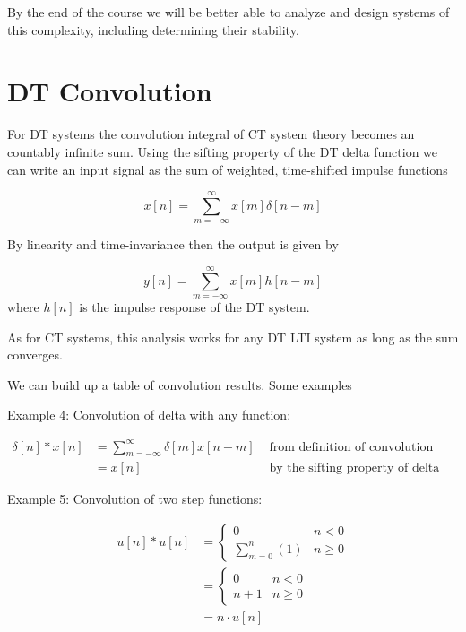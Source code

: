 \documentclass{article}
\begin{document}
By the end of the course we will be better able to analyze and design systems of this complexity, including determining their stability.

\section{DT Convolution}

For DT systems the convolution integral of CT system theory becomes an countably infinite sum. Using the sifting property of the DT delta function we can write an input signal as the sum of weighted, time-shifted impulse functions

\begin{equation}
  x[n] = \sum\limits_{m = -\infty}^{\infty} x[m]\delta[n-m]
\end{equation}

By linearity and time-invariance then the output is given by

\begin{equation}
y[n] = \sum\limits_{m = -\infty}^{\infty} x[m]h[n-m]
\end{equation}
where $h[n]$ is the impulse response of the DT system.

As for CT systems, this analysis works for any DT LTI system as long as the sum converges.

We can build up a table of convolution results. Some examples

Example 4: Convolution of delta with any function:

\begin{align}
  \delta[n] * x[n] &= \sum\limits_{m = -\infty}^{\infty} \delta[m]x[n-m] & \text{ from definition of convolution}\\
  &= x[n] & \text{ by the sifting property of delta function}
\end{align}

Example 5: Convolution of two step functions:

\begin{align}
u[n] * u[n] &= \left\{\begin{array}{cc}
  0 & n < 0\\
  \sum\limits_{m = 0}^{n} (1) & n \geq 0
\end{array}\right.\\
&= \left\{\begin{array}{cc}
  0 & n < 0\\
  n+1 & n \geq 0
\end{array}\right.\\
&= n\cdot u[n]
\end{align}
\end{document}
